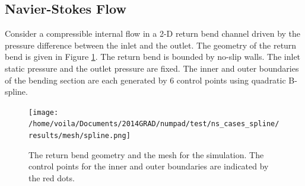\subsection{Navier-Stokes Flow}
\label{sec: chap2 num example NS}
Consider
a compressible internal flow in a 2-D return bend channel 
driven by the pressure difference between the inlet and the outlet.
The geometry of the return bend is given in Figure \ref{fig: NS mesh}.
The return bend is bounded by 
no-slip walls. The inlet static pressure and the outlet pressure are fixed.
The inner and outer boundaries of the bending section are each generated by 6 control points
using quadratic B-spline.\\
\begin{figure}[htbp]\begin{center}
    \texttt{[image: /home/voila/Documents/2014GRAD/numpad/test/ns\_cases\_spline/results/mesh/spline.png]}
    \caption{The return bend geometry and the mesh for the simulation. The control points
             for the inner and outer boundaries are indicated by the red dots.}
    \label{fig: NS mesh}
\end{center}\end{figure}

